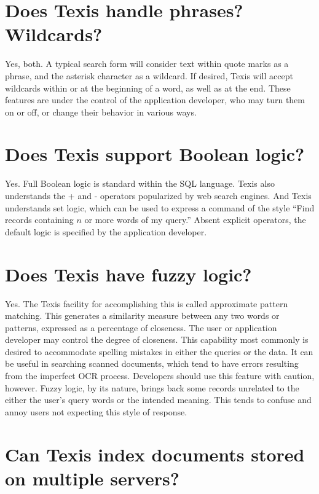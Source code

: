 \section{Does Texis handle phrases? Wildcards? }

Yes, both. A typical search form will consider text within quote marks
as a phrase, and the asterisk character as a wildcard. If desired,
Texis will accept wildcards within or at the beginning of a word, as
well as at the end.  These features are under the control of the
application developer, who may turn them on or off, or change their
behavior in various ways.

\section{Does Texis support Boolean logic? }

Yes. Full Boolean logic is standard within the SQL language. Texis
also understands the + and - operators popularized by web search
engines. And Texis understands set logic, which can be used to express
a command of the style ``Find records containing $n$ or more words of
my query.'' Absent explicit operators, the default logic is specified
by the application developer.

\section{Does Texis have fuzzy logic? }

Yes. The Texis facility for accomplishing this is called approximate
pattern matching. This generates a similarity measure between any two
words or patterns, expressed as a percentage of closeness. The user or
application developer may control the degree of closeness. This
capability most commonly is desired to accommodate spelling mistakes
in either the queries or the data. It can be useful in searching
scanned documents, which tend to have errors resulting from the
imperfect OCR process.  Developers should use this feature with
caution, however. Fuzzy logic, by its nature, brings back some records
unrelated to the either the user's query words or the intended
meaning.  This tends to confuse and annoy users not expecting this
style of response.

\section{Can Texis index documents stored on multiple servers? }

